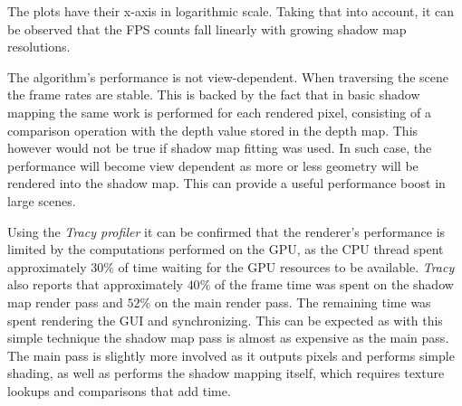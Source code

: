 The plots have their x-axis in logarithmic scale. Taking that into account, it can be observed that the FPS counts fall linearly with growing shadow map resolutions.

The algorithm's performance is not view-dependent. When traversing the scene the frame rates are stable. This is backed by the fact that in basic shadow mapping the same work is performed for each rendered pixel, consisting of a comparison operation with the depth value stored in the depth map. This however would not be true if shadow map fitting was used. In such case, the performance will become view dependent as more or less geometry will be rendered into the shadow map. This can provide a useful performance boost in large scenes.

Using the \textit{Tracy profiler} it can be confirmed that the renderer's performance is limited by the computations performed on the GPU, as the CPU thread spent approximately \(30\%\) of time waiting for the GPU resources to be available. \textit{Tracy} also reports that approximately \(40\%\) of the frame time was spent on the shadow map render pass and \(52\%\) on the main render pass. The remaining time was spent rendering the GUI and synchronizing. This can be expected as with this simple technique the shadow map pass is almost as expensive as the main pass. The main pass is slightly more involved as it outputs pixels and performs simple shading, as well as performs the shadow mapping itself, which requires texture lookups and comparisons that add time.

